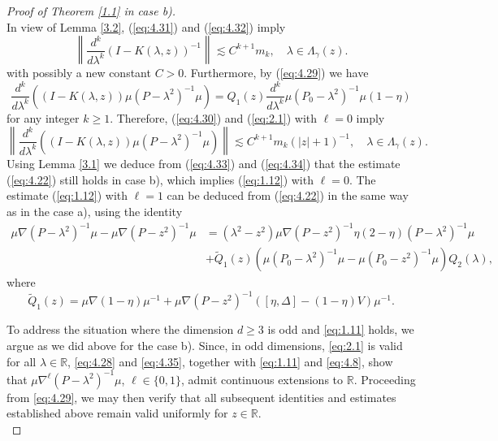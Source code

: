 \documentclass[11pt]{amsart}
\numberwithin{equation}{section}
\def\R{{\mathbb R}}
\begin{document}
\begin{proof}[Proof of Theorem \ref{1.1} in case b)]
\begin{equation}
\end{equation}
In view of Lemma \ref{3.2}, (\ref{eq:4.31}) and (\ref{eq:4.32}) imply
\begin{equation}\label{eq:4.33}
\left\|\frac{d^k}{d\lambda^k}(I-K(\lambda,z))^{-1}\right\|\lesssim C^{k+1}m_k,\quad \lambda\in\Lambda_\gamma(z).
\end{equation}
with possibly a new constant $C>0$. Furthermore, by (\ref{eq:4.29}) we have
\begin{equation*}
 \frac{d^k}{d\lambda^k}\left((I-K(\lambda,z))\mu(P-\lambda^2)^{-1}\mu\right)=
 Q_1(z)\frac{d^k}{d\lambda^k}\mu(P_0-\lambda^2)^{-1}\mu(1-\eta)
 \end{equation*}
 for any integer $k\ge 1$. Therefore, (\ref{eq:4.30}) and (\ref{eq:2.1}) with $\ell =0$ imply
 \begin{equation}\label{eq:4.34}
\left\|\frac{d^k}{d\lambda^k}\left((I-K(\lambda,z))\mu(P-\lambda^2)^{-1}\mu\right)
\right\|\lesssim C^{k+1}m_k(|z|+1)^{-1},\quad \lambda\in\Lambda_\gamma(z).
\end{equation}
Using Lemma \ref{3.1} we deduce from (\ref{eq:4.33}) and (\ref{eq:4.34}) that the estimate (\ref{eq:4.22}) still holds in case b),
which implies (\ref{eq:1.12}) with $\ell=0$. The estimate (\ref{eq:1.12}) with $\ell=1$ can be deduced from (\ref{eq:4.22})
in the same way as in the case a), using the identity
\begin{equation}\label{eq:4.35}
\begin{split}
\mu\nabla(P-\lambda^2)^{-1}\mu-\mu\nabla(P-z^2)^{-1}\mu&=(\lambda^2-z^2)\mu\nabla(P-z^2)^{-1}\eta(2-\eta)(P-\lambda^2)^{-1}\mu\\
 &+\widetilde Q_1(z)(\mu(P_0-\lambda^2)^{-1}\mu-\mu(P_0-z^2)^{-1}\mu)Q_2(\lambda),
 \end{split}
 \end{equation}
 where
 \begin{equation*}
\widetilde Q_1(z)=\mu\nabla(1-\eta)\mu^{-1}+\mu\nabla(P-z^2)^{-1}([\eta,\Delta]-(1-\eta)V)\mu^{-1}.
\end{equation*}


To address the situation where the dimension $d \ge 3$ is odd and \eqref{eq:1.11} holds, we argue as we did above for the case b). Since, in odd dimensions, \eqref{eq:2.1} is valid for all $\lambda \in \R$, \eqref{eq:4.28} and \eqref{eq:4.35}, together with \eqref{eq:1.11} and \eqref{eq:4.8}, show that $\mu \nabla^{\ell}(P-\lambda^2)^{-1}\mu$, $\ell \in \{0, 1\}$, admit continuous extensions to $\R$. Proceeding from \eqref{eq:4.29}, we may then verify that all subsequent identities and estimates established above remain valid uniformly for $z\in\R$.\\
\end{proof}
\end{document}
